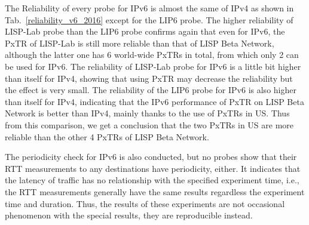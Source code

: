 \begin{table}[!tb]
	\centering
	\caption{Reliability of each probe (IPv6) from Dataset 2016}
	\label{reliability_v6_2016}{
	}
\end{table}

The Reliability of every probe for IPv6 is almost the same of IPv4 as shown in Tab.~\ref{reliability_v6_2016} except for the LIP6 probe. The higher reliability of LISP-Lab probe than the LIP6 probe confirms again that even for IPv6, the PxTR of LISP-Lab is still more reliable than that of LISP Beta Network, although the latter one has 6 world-wide PxTRs in total, from which only 2 can be used for IPv6. The reliability of LISP-Lab probe for IPv6 is a little bit higher than itself for IPv4, showing that using PxTR may decrease the reliability but the effect is very small. The reliability of the LIP6 probe for IPv6 is also higher than itself for IPv4, indicating that the IPv6 performance of PxTR on LISP Beta Network is better than IPv4, mainly thanks to the use of PxTRs in US. Thus from this comparison, we get a conclusion that the two PxTRs in US are more reliable than the other 4 PxTRs of LISP Beta Network.

The periodicity check for IPv6 is also conducted, but no probes show that their RTT measurements to any destinations have periodicity, either. It indicates that the latency of traffic has no relationship with the specified experiment time, i.e., the RTT measurements generally have the same results regardless the experiment time and duration. Thus, the results of these experiments are not occasional phenomenon with the special results, they are reproducible instead.


